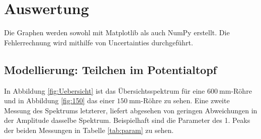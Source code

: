 \section{Auswertung}
\label{sec:Auswertung}

Die Graphen werden sowohl mit Matplotlib \cite{matplotlib} als auch NumPy \cite{numpy} erstellt. Die Fehlerrechnung wird mithilfe von Uncertainties \cite{uncertainties} durchgeführt.

\subsection{Modellierung: Teilchen im Potentialtopf}

In Abbildung \ref{fig:Uebersicht} ist das Übersichtsspektrum für eine $\SI{600}{\milli\meter}$-Röhre und in Abbildung \ref{fig:150} das einer $\SI{150}{\milli\meter}$-Röhre zu sehen.
Eine zweite Messung des Spektrums letzterer, liefert abgesehen von geringen Abweichungen in der Amplitude dasselbe Spektrum.
Beispielhaft sind die Parameter des 1. Peaks der beiden Messungen in Tabelle \ref{tab:param} zu sehen.

